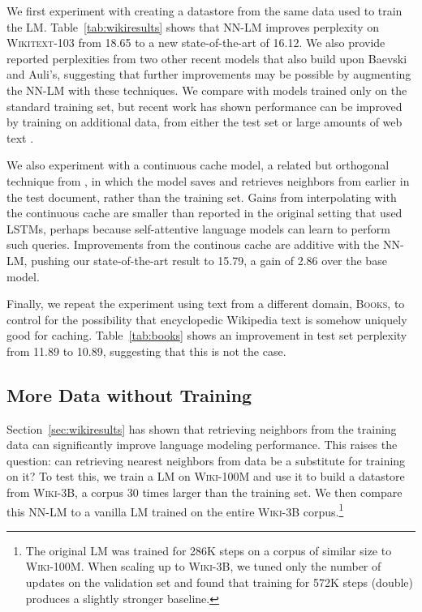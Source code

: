 \documentclass{article} \usepackage{iclr2020_conference,times}
\begin{document}
We first experiment with creating a datastore from the same data used to train the LM.
Table~\ref{tab:wikiresults} shows that NN-LM improves perplexity on \textsc{Wikitext-103} from 18.65 \citep{baevski2019adaptive} to a new state-of-the-art of 16.12.
We also provide reported perplexities from two other recent models that also build upon Baevski and Auli's, suggesting that further improvements may be possible by augmenting the NN-LM with these techniques.
We compare with models trained only on the standard training set, but recent work has shown performance can be improved by training on additional data, from either the test set \citep{krause2019dynamic} or large amounts of web text \citep{shoeybi2019megatron}.


We also experiment with a continuous cache model, a related but orthogonal technique from \citet{grave2017improving}, in which the model saves and retrieves neighbors from earlier in the test document, rather than the training set.
Gains from interpolating with the continuous cache are smaller than reported in the original setting that used LSTMs, perhaps because self-attentive language models can learn to perform such queries.
Improvements from the continous cache are additive with the NN-LM, pushing our state-of-the-art result to 15.79, a gain of 2.86 over the base model.

Finally, we repeat the experiment using text from a different domain, \textsc{Books}, to control for the possibility that encyclopedic Wikipedia text is somehow uniquely good for caching. 
Table~\ref{tab:books} shows an improvement in test set perplexity from 11.89 to 10.89, suggesting that this is not the case. 



\subsection{More Data without Training}
\label{sec:large}

Section~\ref{sec:wikiresults} has shown that retrieving neighbors from the training data can significantly improve language modeling performance.
This raises the question: can retrieving nearest neighbors from data be a substitute for training on it?
To test this, we train a LM on \textsc{Wiki-100M} and use it to build a datastore from \textsc{Wiki-3B}, a corpus 30 times larger than the training set.
We then compare this NN-LM to a vanilla LM trained on the entire \textsc{Wiki-3B} corpus.\footnote{The original LM \citep{baevski2019adaptive} was trained for 286K steps on a corpus of similar size to \textsc{Wiki-100M}. When scaling up to \textsc{Wiki-3B}, we tuned only the number of updates on the validation set and found that training for 572K steps (double) produces a slightly stronger baseline.}
\end{document}
